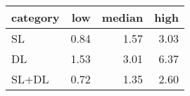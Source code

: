 \begin{tabular}{lrrr}
\hline
 category   &   low &   median &   high \\
\hline
 SL         &  0.84 &     1.57 &   3.03 \\
 DL         &  1.53 &     3.01 &   6.37 \\
 SL+DL      &  0.72 &     1.35 &   2.60 \\
\hline
\end{tabular}